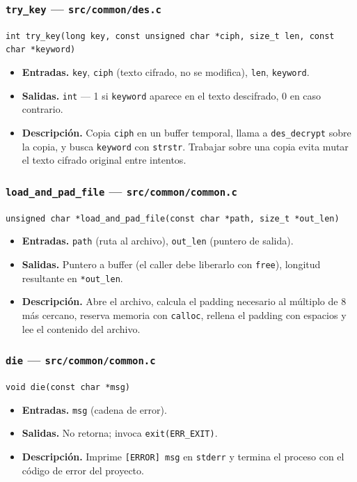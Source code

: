 \documentclass[11pt,letterpaper]{article}
\begin{document}
\subsubsection*{\texttt{try\_key} --- \texttt{src/common/des.c}}
\small\texttt{int try\_key(long key, const unsigned char *ciph, size\_t len, const char *keyword)}\normalsize
\begin{itemize}[nosep]
    \item \textbf{Entradas.} \texttt{key}, \texttt{ciph} (texto cifrado, no se modifica), \texttt{len}, \texttt{keyword}.
    \item \textbf{Salidas.} \texttt{int} --- 1 si \texttt{keyword} aparece en el texto descifrado, 0 en caso contrario.
    \item \textbf{Descripción.} Copia \texttt{ciph} en un buffer temporal, llama a \texttt{des\_decrypt} sobre la copia, y busca \texttt{keyword} con \texttt{strstr}. Trabajar sobre una copia evita mutar el texto cifrado original entre intentos.
\end{itemize}

\subsubsection*{\texttt{load\_and\_pad\_file} --- \texttt{src/common/common.c}}
\small\texttt{unsigned char *load\_and\_pad\_file(const char *path, size\_t *out\_len)}\normalsize
\begin{itemize}[nosep]
    \item \textbf{Entradas.} \texttt{path} (ruta al archivo), \texttt{out\_len} (puntero de salida).
    \item \textbf{Salidas.} Puntero a buffer (el caller debe liberarlo con \texttt{free}), longitud resultante en \texttt{*out\_len}.
    \item \textbf{Descripción.} Abre el archivo, calcula el padding necesario al múltiplo de 8 más cercano, reserva memoria con \texttt{calloc}, rellena el padding con espacios y lee el contenido del archivo.
\end{itemize}

\subsubsection*{\texttt{die} --- \texttt{src/common/common.c}}
\small\texttt{void die(const char *msg)}\normalsize
\begin{itemize}[nosep]
    \item \textbf{Entradas.} \texttt{msg} (cadena de error).
    \item \textbf{Salidas.} No retorna; invoca \texttt{exit(ERR\_EXIT)}.
    \item \textbf{Descripción.} Imprime \texttt{[ERROR] msg} en \texttt{stderr} y termina el proceso con el código de error del proyecto.
\end{itemize}
\end{document}
